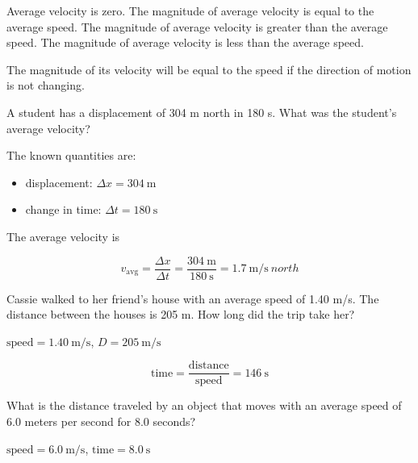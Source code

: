 \documentclass[answers]{exam}
\begin{document}
\begin{questions}
\begin{questions}
\begin{choices}
\choice Average velocity is zero.
\CorrectChoice The magnitude of average velocity is equal to the average speed.
\choice The magnitude of average velocity is greater than the average speed.
\choice The magnitude of average velocity is less than the average speed.
\end{choices}

\begin{solution}
The magnitude of its velocity will be equal to the speed if the direction of motion is not changing.
\end{solution}


\question
A student has a displacement of 304 m north in 180 s. What was the student's average velocity?

\begin{solution}
The known quantities are:

\begin{itemize}
    \item displacement: $\Delta{x} = \SI{304}{\meter}$
    \item change in time: $\Delta{t} = \SI{180}{\second}$
\end{itemize}

The average velocity is

\begin{equation*}
    v_{\mathrm{avg}} = \frac{\Delta{x}}{\Delta{t}} = \frac{\SI{304}{\meter}}{\SI{180}{\second}} = \SI[per-mode=symbol]{1.7}{\meter\per\second\ north}
\end{equation*}
\end{solution}



\question
Cassie walked to her friend’s house with an average speed of 1.40 m/s. The distance between the houses is 205 m. How long did the trip take her?

\begin{solution}
    $\text{speed} = \SI{1.40}{\meter/\second}$, $D = \SI{205}{\meter/\second}$

\begin{equation*}
    \text{time} = \frac{\text{distance}}{\text{speed}} = \SI{146}{\second}
\end{equation*}
\end{solution}

\question
What is the distance traveled by an object that moves with an average speed of 6.0 meters per second for 8.0 seconds?

\begin{solution}
    $\text{speed} = \SI{6.0}{\meter/\second}$, $\text{time} = \SI{8.0}{\second}$


\end{solution}
\end{questions}
\end{questions}
\end{document}

